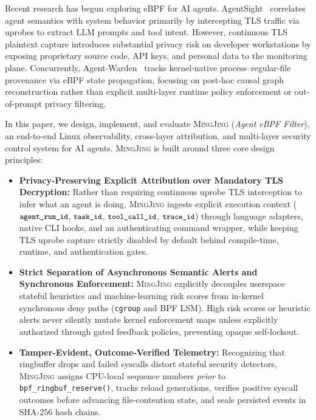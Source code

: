 \documentclass[10pt,twocolumn,letterpaper]{article}
\newcommand{\sys}{\textsc{MingJing}}
\newcommand{\code}[1]{\texttt{\small #1}}
\begin{document}
Recent research has begun exploring eBPF for AI agents. AgentSight~\cite{agentsight2025} correlates agent semantics with system behavior primarily by intercepting TLS traffic via uprobes to extract LLM prompts and tool intent. However, continuous TLS plaintext capture introduces substantial privacy risk on developer workstations by exposing proprietary source code, API keys, and personal data to the monitoring plane. Concurrently, Agent-Warden~\cite{agentwarden2026} tracks kernel-native process--regular-file provenance via eBPF state propagation, focusing on post-hoc causal graph reconstruction rather than explicit multi-layer runtime policy enforcement or out-of-prompt privacy filtering.

In this paper, we design, implement, and evaluate \sys{} (\emph{Agent eBPF Filter}), an end-to-end Linux observability, cross-layer attribution, and multi-layer security control system for AI agents. \sys{} is built around three core design principles:
\begin{itemize}
  \item \textbf{Privacy-Preserving Explicit Attribution over Mandatory TLS Decryption:} Rather than requiring continuous uprobe TLS interception to infer what an agent is doing, \sys{} ingests explicit execution context ($\code{agent\_run\_id}$, $\code{task\_id}$, $\code{tool\_call\_id}$, $\code{trace\_id}$) through language adapters, native CLI hooks, and an authenticating command wrapper, while keeping TLS uprobe capture strictly disabled by default behind compile-time, runtime, and authentication gates.
  \item \textbf{Strict Separation of Asynchronous Semantic Alerts and Synchronous Enforcement:} \sys{} explicitly decouples userspace stateful heuristics and machine-learning risk scores from in-kernel synchronous deny paths (\code{cgroup} and BPF LSM). High risk scores or heuristic alerts never silently mutate kernel enforcement maps unless explicitly authorized through gated feedback policies, preventing opaque self-lockout.
  \item \textbf{Tamper-Evident, Outcome-Verified Telemetry:} Recognizing that ringbuffer drops and failed syscalls distort stateful security detectors, \sys{} assigns CPU-local sequence numbers \emph{prior} to \code{bpf\_ringbuf\_reserve()}, tracks reload generations, verifies positive syscall outcomes before advancing file-contention state, and seals persisted events in SHA-256 hash chains.
\end{itemize}
\end{document}
